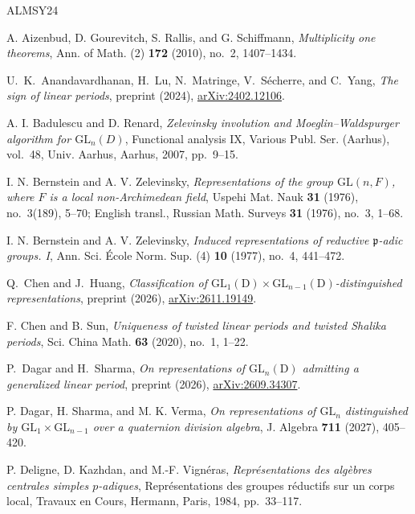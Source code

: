 \documentclass[11pt]{amsart}
\numberwithin{equation}{section}
\theoremstyle{plain}
\theoremstyle{definition}
\theoremstyle{remark}
\begin{document}
\begin{thebibliography}{ALMSY24}
	
	A. Aizenbud, D. Gourevitch, S. Rallis, and G. Schiffmann, \emph{Multiplicity one theorems}, Ann. of Math. (2) \textbf{172} (2010), no.~2, 1407--1434.
	
	U.~K.~Anandavardhanan, H.~Lu, N.~Matringe, V.~S\'echerre, and C.~Yang,
	\emph{The sign of linear periods},
	preprint (2024), \href{https://arxiv.org/abs/2402.12106}{arXiv:2402.12106}.
	
	A. I. Badulescu and D. Renard, \emph{Zelevinsky involution and Moeglin--Waldspurger algorithm for $\mathrm{GL}_n(D)$}, Functional analysis IX, Various Publ. Ser. (Aarhus), vol.~48, Univ. Aarhus, Aarhus, 2007, pp.~9--15.
	
	I. N. Bernstein and A. V. Zelevinsky, \emph{Representations of the group $\mathrm{GL}(n,F)$, where $F$ is a local non-Archimedean field}, Uspehi Mat. Nauk \textbf{31} (1976), no.~3(189), 5--70; English transl., Russian Math. Surveys \textbf{31} (1976), no.~3, 1--68.
	
	I. N. Bernstein and A. V. Zelevinsky, \emph{Induced representations of reductive $\mathfrak p$-adic groups. I}, Ann. Sci. \'Ecole Norm. Sup. (4) \textbf{10} (1977), no.~4, 441--472.
	
	Q.~Chen and J.~Huang,
	\emph{Classification of $\mathrm{GL}_1(\mathrm{D})\times\mathrm{GL}_{n-1}(\mathrm{D})$-distinguished representations},
	preprint (2026), \href{https://arxiv.org/abs/2611.19149}{arXiv:2611.19149}.
	
	F. Chen and B. Sun, \emph{Uniqueness of twisted linear periods and twisted Shalika periods}, Sci. China Math. \textbf{63} (2020), no.~1, 1--22.
	
P.~Dagar and H.~Sharma,
\emph{On representations of $\mathrm{GL}_n(\mathrm{D})$ admitting a generalized linear period},
preprint (2026), \href{https://arxiv.org/abs/2609.34307}{arXiv:2609.34307}.
	
	P. Dagar, H. Sharma, and M. K. Verma, \emph{On representations of $\mathrm{GL}_n$ distinguished by $\mathrm{GL}_1\times\mathrm{GL}_{n-1}$ over a quaternion division algebra}, J. Algebra \textbf{711} (2027), 405--420.
	
	P. Deligne, D. Kazhdan, and M.-F. Vign\'eras, \emph{Repr\'esentations des alg\`ebres centrales simples $p$-adiques}, Repr\'esentations des groupes r\'eductifs sur un corps local, Travaux en Cours, Hermann, Paris, 1984, pp.~33--117.
	

\end{thebibliography}
\end{document}
